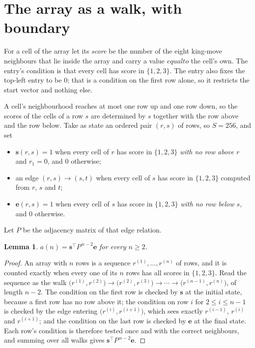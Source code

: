 \documentclass[11pt,a4paper]{article}
\theoremstyle{plain}
\newtheorem{lemma}[theorem]{Lemma}
\theoremstyle{definition}
\begin{document}
\section{The array as a walk, with boundary}

For a cell of the array let its \emph{score} be the number of the eight king-move neighbours that lie inside
the array and carry a value $equal to$ the cell's own. The entry's condition is that every cell
has score in $\{1,2,3\}$. The entry also fixes the top-left entry to be $0$; that is a condition on the first row alone, so it restricts the start vector and nothing else.

A cell's neighbourhood reaches at most one row up and one row down, so the scores of the
cells of a row $s$ are determined by $s$ together with the row above and the row below.
Take as state an ordered pair $(r,s)$ of rows, so $S=256$, and set
\begin{itemize}
\item $\mathbf{s}(r,s)=1$ when every cell of $r$ has score in $\{1,2,3\}$ \emph{with no row
above $r$} and $r_1=0$, and $0$ otherwise;
\item an edge $(r,s)\to(s,t)$ when every cell of $s$ has score in $\{1,2,3\}$ computed from
$r$, $s$ and $t$;
\item $\mathbf{e}(r,s)=1$ when every cell of $s$ has score in $\{1,2,3\}$ \emph{with no row
below $s$}, and $0$ otherwise.
\end{itemize}
Let $P$ be the adjacency matrix of that edge relation.

\begin{lemma}\label{lem:walk}
$a(n)=\mathbf{s}^{\!\top}P^{\,n-2}\mathbf{e}$ for every $n\ge2$.
\end{lemma}

\begin{proof}
An array with $n$ rows is a sequence $r^{(1)},\dots,r^{(n)}$ of rows, and it is counted
exactly when every one of its $n$ rows has all scores in $\{1,2,3\}$. Read the sequence as the
walk $\bigl(r^{(1)},r^{(2)}\bigr)\to\bigl(r^{(2)},r^{(3)}\bigr)\to\cdots\to
\bigl(r^{(n-1)},r^{(n)}\bigr)$, of length $n-2$. The condition on the first row is
checked by $\mathbf{s}$ at the initial state, because a first row has no row above it; the
condition on row $i$ for $2\le i\le n-1$ is checked by the edge entering
$\bigl(r^{(i)},r^{(i+1)}\bigr)$, which sees exactly $r^{(i-1)}$, $r^{(i)}$ and
$r^{(i+1)}$; and the condition on the last row is checked by $\mathbf{e}$ at the final
state. Each row's condition is therefore tested once and with the correct neighbours, and
summing over all walks gives $\mathbf{s}^{\!\top}P^{\,n-2}\mathbf{e}$.
\end{proof}
\end{document}
